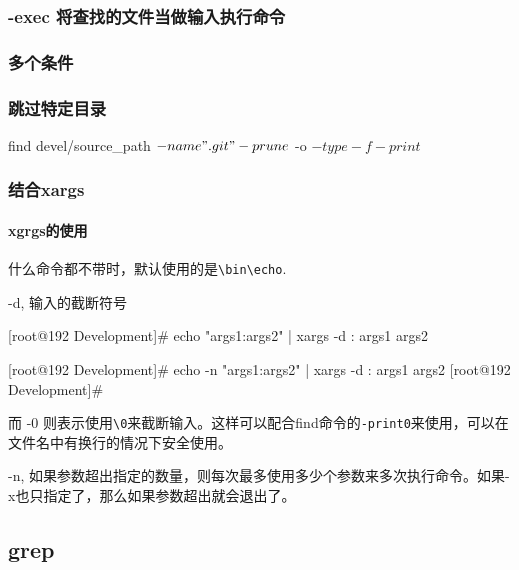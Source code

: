 \subsubsection{-exec 将查找的文件当做输入执行命令}

\subsubsection{多个条件}

\subsubsection{跳过特定目录}

\begin{Bash}[]

find devel/source_path \( -name ".git" -prune \) -o \( -type -f -print \)

\end{Bash}

\subsubsection{结合xargs}

\paragraph{xgrgs的使用}

什么命令都不带时，默认使用的是\lstinline$\bin\echo$.

-d, 输入的截断符号

\begin{Bash}

[root@192 Development]# echo "args1:args2" | xargs -d :
args1 args2

[root@192 Development]# echo -n "args1:args2" | xargs -d :
args1 args2
[root@192 Development]# 

\end{Bash}

而 -0 则表示使用\lstinline$\0$来截断输入。这样可以配合find命令的\lstinline$-print0$来使用，可以在文件名中有换行的情况下安全使用。


-n, 如果参数超出指定的数量，则每次最多使用多少个参数来多次执行命令。如果-x也只指定了，那么如果参数超出就会退出了。


\subsection{grep}

